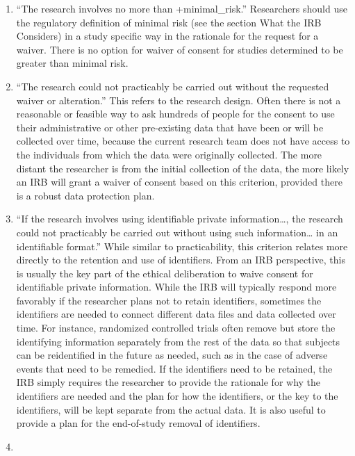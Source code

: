 \documentclass[
]{book}
\begin{document}
\begin{enumerate}
\def\labelenumi{\roman{enumi}.}
\item
  ``The research involves no more than +minimal\_risk\textbar.'' Researchers should use the regulatory definition of minimal risk (see the section What the IRB Considers) in a study specific way in the rationale for the request for a waiver. There is no option for waiver of consent for studies determined to be greater than minimal risk.
\item
  ``The research could not practicably be carried out without the requested waiver or alteration.'' This refers to the research design. Often there is not a reasonable or feasible way to ask hundreds of people for the consent to use their administrative or other pre-existing data that have been or will be collected over time, because the current research team does not have access to the individuals from which the data were originally collected. The more distant the researcher is from the initial collection of the data, the more likely an IRB will grant a waiver of consent based on this criterion, provided there is a robust data protection plan.
\item
  ``If the research involves using identifiable private information\ldots, the research could not practicably be carried out without using such information\ldots{} in an identifiable format.'' While similar to practicability, this criterion relates more directly to the retention and use of identifiers. From an IRB perspective, this is usually the key part of the ethical deliberation to waive consent for identifiable private information. While the IRB will typically respond more favorably if the researcher plans not to retain identifiers, sometimes the identifiers are needed to connect different data files and data collected over time. For instance, randomized controlled trials often remove but store the identifying information separately from the rest of the data so that subjects can be reidentified in the future as needed, such as in the case of adverse events that need to be remedied. If the identifiers need to be retained, the IRB simply requires the researcher to provide the rationale for why the identifiers are needed and the plan for how the identifiers, or the key to the identifiers, will be kept separate from the actual data. It is also useful to provide a plan for the end-of-study removal of identifiers.
\item

\end{enumerate}
\end{document}
